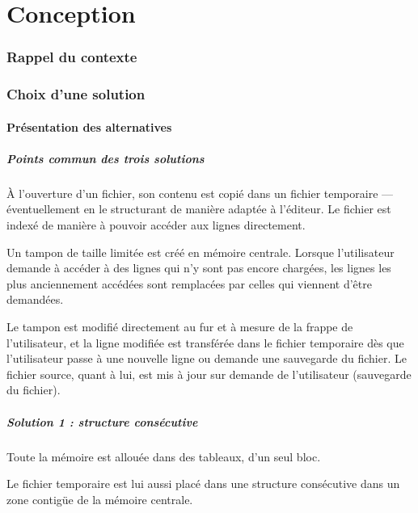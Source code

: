 \part{Conception}

\section{Rappel du contexte}



\section{Choix d'une solution}
\subsection{Présentation des alternatives}

\subsubsection{Points commun des trois solutions}
À l'ouverture d'un fichier, son contenu est copié dans un fichier temporaire --- éventuellement en le structurant de manière adaptée à l'éditeur. Le fichier est indexé de manière à pouvoir accéder aux lignes directement.

Un tampon de taille limitée est créé en mémoire centrale. Lorsque l'utilisateur demande à accéder à des lignes qui n'y sont pas encore chargées, les lignes les plus anciennement accédées sont remplacées par celles qui viennent d'être demandées.

Le tampon est modifié directement au fur et à mesure de la frappe de l'utilisateur, et la ligne modifiée est transférée dans le fichier temporaire dès que l'utilisateur passe à une nouvelle ligne ou demande une sauvegarde du fichier. Le fichier source, quant à lui, est mis à jour sur demande de l'utilisateur (sauvegarde du fichier).

\subsubsection{Solution 1 : structure consécutive}
Toute la mémoire est allouée dans des tableaux, d'un seul bloc.

Le fichier temporaire est lui aussi placé dans une structure consécutive dans
un zone contigüe de la mémoire centrale.

